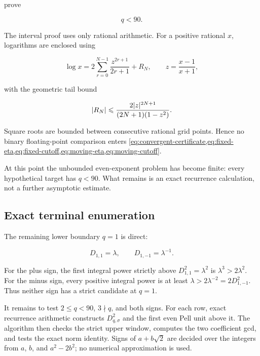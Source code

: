 prove

\begin{equation}
 q<90.
 \label{eq:q-90}
\end{equation}

The interval proof uses only rational arithmetic. For a positive rational
$x$, logarithms are enclosed using

\begin{equation}
 \log x
 =2\sum_{r=0}^{N-1}\frac{z^{2r+1}}{2r+1}+R_N,
 \qquad
 z=\frac{x-1}{x+1},
 \label{eq:log-series}
\end{equation}

with the geometric tail bound

\begin{equation}
 \lvert R_N\rvert
 \leqslant\frac{2\lvert z\rvert^{2N+1}}{(2N+1)(1-z^2)}.
 \label{eq:log-tail}
\end{equation}

Square roots are bounded between consecutive rational grid points. Hence no
binary floating-point comparison enters
\cref{eq:convergent-certificate,eq:fixed-eta,eq:fixed-cutoff,eq:moving-eta,eq:moving-cutoff}.

At this point the unbounded even-exponent problem has become finite: every
hypothetical target has $q<90$. What remains is an exact recurrence
calculation, not a further asymptotic estimate.

\subsection{Exact terminal enumeration}

The remaining lower boundary $q=1$ is direct:

\begin{equation}
 D_{1,1}=\lambda,
 \qquad
 D_{1,-1}=\lambda^{-1}.
 \label{eq:q1-boundary}
\end{equation}

For the plus sign, the first integral power strictly above
$D_{1,1}^2=\lambda^2$ is $\lambda^3>2\lambda^2$. For the minus sign, every
positive integral power is at least
$\lambda>2\lambda^{-2}=2D_{1,-1}^2$. Thus neither sign has a strict
candidate at $q=1$.

It remains to test $2\leqslant q<90$, $3\nmid q$, and both signs. For each
row, exact recurrence arithmetic constructs $D_{q,\sigma}^2$ and the first
even Pell unit above it. The algorithm then checks the strict upper window,
computes the two coefficient gcd, and tests the exact norm identity. Signs of
$a+b\sqrt2$ are decided over the integers from $a$, $b$, and
$a^2-2b^2$; no numerical approximation is used.

